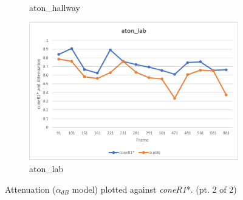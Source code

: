 \begin{appendices}
\begin{figure}
\begin{subfigure}{.45\linewidth}
  \caption{aton\_hallway}
\end{subfigure}
\hfill
\begin{subfigure}{.45\linewidth}
  \includegraphics[width=1\linewidth]{figures/appendix/lab_db.jpg}
  \caption{aton\_lab}
\end{subfigure}

\caption{Attenuation ($\alpha_{dB}$ model) plotted against \textit{coneR1}*. (pt. 2 of 2)}
\end{figure}


\end{appendices}
